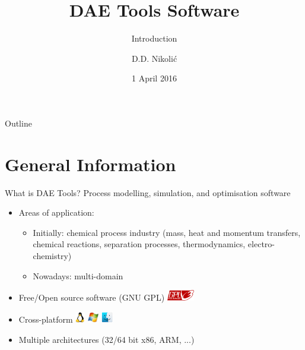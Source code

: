 \documentclass[compress,newPxFont,sthlmFooter]{beamer}
\title{DAE Tools Software}
\subtitle{Introduction}
\author{D.D. Nikolić}
\institute
{
  DAE Tools Project, \url{http://www.daetools.com}
}
\date{1 April 2016}
\begin{document}
\maketitle

\begin{frame}{Outline}
\tableofcontents[sectionstyle=show, 
                 subsectionstyle=hide]
\end{frame} 

\section{General Information}

\begin{frame}{What is DAE Tools?} 
Process \alert{modelling}, \alert{simulation}, and \alert{optimisation} software
\begin{itemize}
  \item Areas of application:
    \begin{itemize}
      \item Initially: chemical process industry (mass, heat and momentum transfers, chemical reactions, 
                                                  separation processes, thermodynamics, electro-chemistry)
      \item Nowadays: \alert{multi-domain}
    \end{itemize}
  \item Free/Open source software (\alert{GNU GPL}) \includegraphics[align=c,height=1.3em]{gnu_gpl3.png}
  \item \alert{Cross-platform} \includegraphics[align=c,height=1.3em]{linux.png} 
                               \includegraphics[align=c,height=1.3em]{windows.png} 
                               \includegraphics[align=c,height=1.3em]{macos.png}
  \item \alert{Multiple architectures} (32/64 bit x86, ARM, ...)
\end{itemize}
\end{frame}
\end{document}
